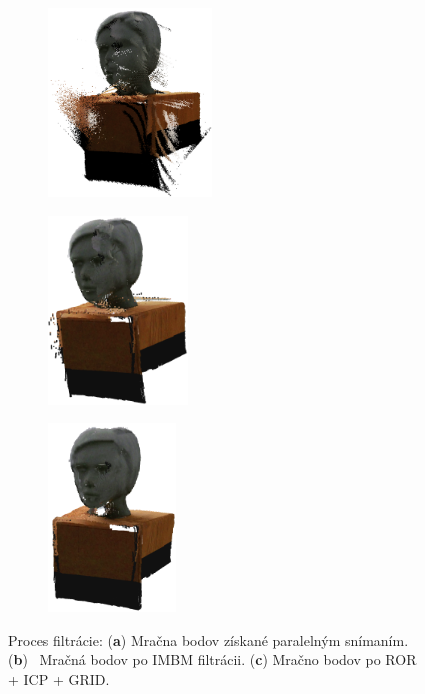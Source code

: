 \begin{figure}[H]
	\centering
	\begin{subfigure}[b]{0.32\textwidth}
		\centering
		\includegraphics[height=5cm]{figures/model_input.png}
		\caption{}
		\label{fig:model:input}
	\end{subfigure}
	\hfill
	\begin{subfigure}[b]{0.32\textwidth}
		\centering
		\includegraphics[height=5cm]{figures/model_orig.png}
		\caption{}
		\label{fig:model:imbm}
	\end{subfigure}
	\hfill
	\begin{subfigure}[b]{0.32\textwidth}
		\centering
		\includegraphics[height=5cm]{figures/model_output.png}
		\caption{}
		\label{fig:model:result}
	\end{subfigure}
	\caption{Proces filtrácie: (\textbf{a}) Mračna bodov získané paralelným snímaním. (\textbf{b}) \, Mračná bodov po IMBM filtrácii. (\textbf{c}) Mračno bodov po ROR + ICP + GRID.}
	\label{fig:model}
\end{figure}



